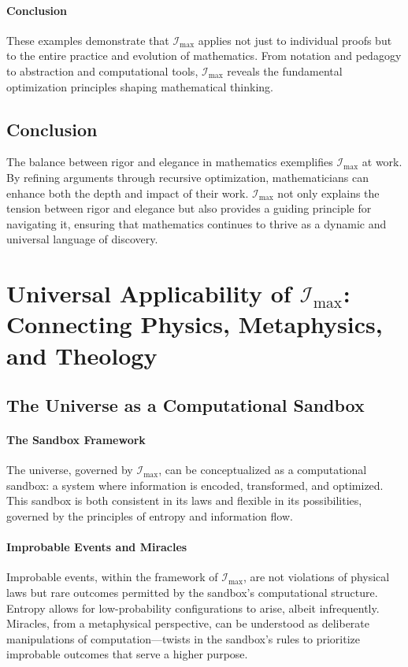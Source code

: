 \documentclass[12pt]{article}
\begin{document}
\paragraph{Conclusion}
These examples demonstrate that \(\mathcal{I}_{\text{max}}\) applies not just to individual proofs but to the entire practice and evolution of mathematics. From notation and pedagogy to abstraction and computational tools, \(\mathcal{I}_{\text{max}}\) reveals the fundamental optimization principles shaping mathematical thinking.


\subsection{Conclusion}
The balance between rigor and elegance in mathematics exemplifies \(\mathcal{I}_{\text{max}}\) at work. By refining arguments through recursive optimization, mathematicians can enhance both the depth and impact of their work. \(\mathcal{I}_{\text{max}}\) not only explains the tension between rigor and elegance but also provides a guiding principle for navigating it, ensuring that mathematics continues to thrive as a dynamic and universal language of discovery.


\section{Universal Applicability of \(\mathcal{I}_{\text{max}}\): Connecting Physics, Metaphysics, and Theology}

\subsection{The Universe as a Computational Sandbox}

\paragraph{The Sandbox Framework}
The universe, governed by \(\mathcal{I}_{\text{max}}\), can be conceptualized as a computational sandbox: a system where information is encoded, transformed, and optimized. This sandbox is both consistent in its laws and flexible in its possibilities, governed by the principles of entropy and information flow.

\paragraph{Improbable Events and Miracles}
Improbable events, within the framework of \(\mathcal{I}_{\text{max}}\), are not violations of physical laws but rare outcomes permitted by the sandbox's computational structure. Entropy allows for low-probability configurations to arise, albeit infrequently. Miracles, from a metaphysical perspective, can be understood as deliberate manipulations of computation—twists in the sandbox's rules to prioritize improbable outcomes that serve a higher purpose.
\end{document}
